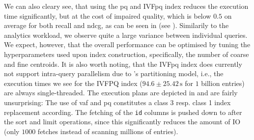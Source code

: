 We can also cleary see, that using the \acrshort{pq} and IVF\acrshort{pq} index reduces the execution time significantly, but at the cost of impaired quality, which is below $0.5$ on average for both recall and n\acrshort{dcg}, as can be seen in  (see ). Similarily to the analytics workload, we observe quite a large variance between individual queries. We expect, however, that the overall performance can be optimised by tuning the hyperparameters used upon index construction, specifically, the number of coarse and fine centroids. It is also worth noting, that the IVF\acrshort{pq} index does currently not support intra-query parallelism due to \cottontail{}'s partitioning model, i.e., the execution times we see for the IVFPQ index ($94.6 \pm 25.42 \, \si{\second}$ for $1$ billion entries) are always single-threaded. The execution plans are depicted in  and are fairly unsurprising: The use of \acrshort{vaf} and \acrshort{pq} constitutes a class 3 resp. class 1 index replacement according. The fetching of the \texttt{id} columns is pushed down to after the sort and limit operations, since this significantly reduces the amount of IO (only $1000$ fetches instead of scanning millions of entries).


